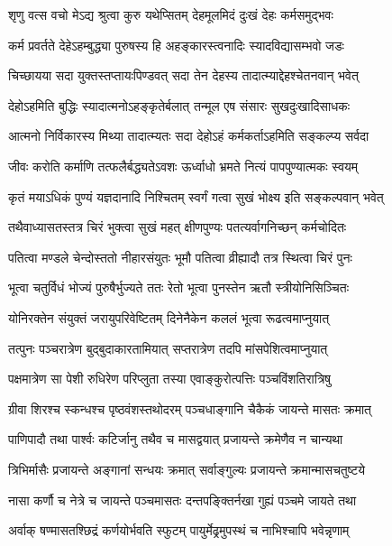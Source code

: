 \twolineshloka
{शृणु वत्स वचो मेऽद्य श्रुत्वा कुरु यथेप्सितम्}
{देहमूलमिदं दुःखं देहः कर्मसमुद्भवः} %

\twolineshloka
{कर्म प्रवर्तते देहेऽहम्बुद्ध्या पुरुषस्य हि}
{अहङ्कारस्त्वनादिः स्यादविद्यासम्भवो जडः} %

\twolineshloka
{चिच्छायया सदा युक्तस्तप्तायःपिण्डवत् सदा}
{तेन देहस्य तादात्म्याद्देहश्चेतनवान् भवेत्} %

\twolineshloka
{देहोऽहमिति बुद्धिः स्यादात्मनोऽहङ्कृतेर्बलात्}
{तन्मूल एष संसारः सुखदुःखादिसाधकः} %

\twolineshloka
{आत्मनो निर्विकारस्य मिथ्या तादात्म्यतः सदा}
{देहोऽहं कर्मकर्ताऽहमिति सङ्कल्प्य सर्वदा} %

\twolineshloka
{जीवः करोति कर्माणि तत्फलैर्बद्ध्यतेऽवशः}
{ऊर्ध्वाधो भ्रमते नित्यं पापपुण्यात्मकः स्वयम्} %

\twolineshloka
{कृतं मयाऽधिकं पुण्यं यज्ञदानादि निश्चितम्}
{स्वर्गं गत्वा सुखं भोक्ष्य इति सङ्कल्पवान् भवेत्} %

\twolineshloka
{तथैवाध्यासतस्तत्र चिरं भुक्त्वा सुखं महत्}
{क्षीणपुण्यः पतत्यर्वागनिच्छन् कर्मचोदितः} %

\twolineshloka
{पतित्वा मण्डले चेन्दोस्ततो नीहारसंयुतः}
{भूमौ पतित्वा व्रीह्यादौ तत्र स्थित्वा चिरं पुनः} %

\twolineshloka
{भूत्वा चतुर्विधं भोज्यं पुरुषैर्भुज्यते ततः}
{रेतो भूत्वा पुनस्तेन ऋतौ स्त्रीयोनिसिञ्चितः} %

\twolineshloka
{योनिरक्तेन संयुक्तं जरायुपरिवेष्टितम्}
{दिनेनैकेन कललं भूत्वा रूढत्वमाप्नुयात्} %

\twolineshloka
{तत्पुनः पञ्चरात्रेण बुद्बुदाकारतामियात्}
{सप्तरात्रेण तदपि मांसपेशित्वमाप्नुयात्} %

\twolineshloka
{पक्षमात्रेण सा पेशी रुधिरेण परिप्लुता}
{तस्या एवाङ्कुरोत्पत्तिः पञ्चविंशतिरात्रिषु} %

\twolineshloka
{ग्रीवा शिरश्च स्कन्धश्च पृष्ठवंशस्तथोदरम्}
{पञ्चधाङ्गानि चैकैकं जायन्ते मासतः क्रमात्} %

\twolineshloka
{पाणिपादौ तथा पार्श्वः कटिर्जानु तथैव च}
{मासद्वयात् प्रजायन्ते क्रमेणैव न चान्यथा} %

\twolineshloka
{त्रिभिर्मासैः प्रजायन्ते अङ्गानां सन्धयः क्रमात्}
{सर्वाङ्गुल्यः प्रजायन्ते क्रमान्मासचतुष्टये} %

\twolineshloka
{नासा कर्णौ च नेत्रे च जायन्ते पञ्चमासतः}
{दन्तपङ्क्तिर्नखा गुह्यं पञ्चमे जायते तथा} %

\twolineshloka
{अर्वाक् षण्मासतश्छिद्रं कर्णयोर्भवति स्फुटम्}
{पायुर्मेढ्रमुपस्थं च नाभिश्चापि भवेन्नृणाम्} %

